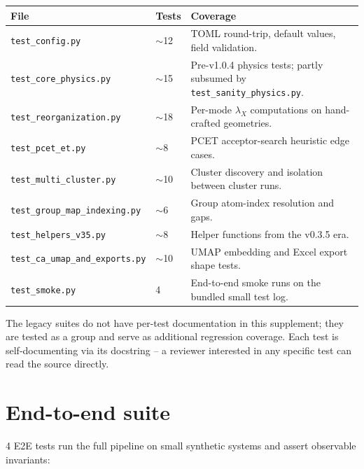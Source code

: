 \documentclass[10pt,a4paper,twoside]{article}
\newcommand{\fn}[1]{\texttt{#1}}
\begin{document}
\begin{longtable}{p{} p{} p{}}
\toprule
\textbf{File} & \textbf{Tests} & \textbf{Coverage} \\
\midrule
\fn{test\_config.py} & $\sim$12 & TOML round-trip,
   default values, field validation. \\
\fn{test\_core\_physics.py} & $\sim$15 & Pre-v1.0.4
   physics tests; partly subsumed by
   \fn{test\_sanity\_physics.py}. \\
\fn{test\_reorganization.py} & $\sim$18 & Per-mode
   $\lambda_X$ computations on hand-crafted geometries. \\
\fn{test\_pcet\_et.py} & $\sim$8 & PCET acceptor-search
   heuristic edge cases. \\
\fn{test\_multi\_cluster.py} & $\sim$10 & Cluster discovery
   and isolation between cluster runs. \\
\fn{test\_group\_map\_indexing.py} & $\sim$6 & Group
   atom-index resolution and gaps. \\
\fn{test\_helpers\_v35.py} & $\sim$8 & Helper functions
   from the v0.3.5 era. \\
\fn{test\_ca\_umap\_and\_exports.py} & $\sim$10 & UMAP
   embedding and Excel export shape tests. \\
\fn{test\_smoke.py} & 4 & End-to-end smoke runs on the
   bundled small test log. \\
\bottomrule
\end{longtable}

The legacy suites do not have per-test documentation in this
supplement; they are tested as a group and serve as additional
regression coverage. Each test is self-documenting via its
docstring -- a reviewer interested in any specific test can read
the source directly.

\section{End-to-end suite}

4 E2E tests run the full pipeline on small synthetic systems and
assert observable invariants:
\end{document}
